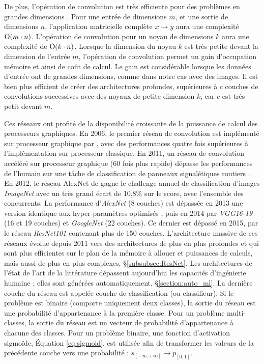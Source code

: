 De plus, l'opération de convolution est très efficiente pour des problèmes en grandes dimensions \cite{goodfellow_deep_2016}.
Pour une entrée de dimensions $m$, et une sortie de dimensions $n$, l'application matricielle complète $x \rightarrow y$ aura une complexité $\operatorname{O}(m \cdot n)$.
L'opération de convolution pour un noyau de dimensions $k$ aura une complexité de $\operatorname{O}(k \cdot n)$.
Lorsque la dimension du noyau $k$ est très petite devant la dimension de l'entrée $m$, l'opération de convolution permet un gain d'occupation mémoire et ainsi de coût de calcul.
Le gain est considérable lorsque les données d'entrée ont de grandes dimensions, comme dans notre cas avec des images.
Il est bien plus efficient de créer des architectures profondes, supérieures à $c$ couches de convolutions successives avec des noyaux de petite dimension $k$, car $c$ est très petit devant $m$.

Ces réseaux ont profité de la disponibilité croissante de la puissance de calcul des processeurs graphiques.
En 2006, le premier réseau de convolution est implémenté sur processeur graphique par \citeauthor{chellapilla_high_2006} \cite{chellapilla_high_2006}, avec des performances quatre fois supérieures à l'implémentation sur processeur classique.
En 2011, un réseau de convolution accéléré sur processeur graphique (60 fois plus rapide) dépasse les performances de l'humain sur une tâche de classification de panneaux signalétiques routiers \cite{ciresan_flexible_2011}.
En 2012, le réseau AlexNet de \citeauthor{krizhevsky_imagenet_2012} \cite{krizhevsky_imagenet_2012} gagne le challenge annuel de classification d'images \textit{ImageNet} \cite{deng_imagenet_2009} avec un très grand écart de 10,8\% sur le score, avec l'ensemble des concurrents.
La performance d'\textit{AlexNet} (8 couches) est dépassée en 2013 une version identique aux hyper-paramètres optimisés \cite{zeiler_visualizing_2013}, puis en 2014 par \textit{VGG16-19} (16 et 19 couches) \cite{simonyan_very_2014}  et \textit{GoogleNet} (22 couches).
Ce dernier est dépassé en 2015, par le réseau \textit{ResNet101} \cite{he_deep_2015} contenant plus de 150 couches.
L'architecture massive de ces réseaux évolue depuis 2011 vers des architectures de plus en plus profondes \cite{he_deep_2015} et qui sont plus efficientes sur le plan de la mémoire à allouer et puissances de calculs, mais aussi de plus en plus complexes, §\ref{subsubsec:ResNet}.
Les architectures de l'état de l'art de la littérature dépassent aujourd'hui les capacités d'ingénierie humaine ; elles sont générées automatiquement, §\ref{section:auto_ml}.
La dernière couche du réseau est appelée couche de classification (ou classifieur).
Si le problème est binaire (comporte uniquement deux classes), la sortie du réseau est une probabilité d'appartenance à la première classe.
Pour un problème multi-classes, la sortie du réseau est un vecteur de probabilité d'appartenance à chacune des classes.
Pour un problème binaire, une fonction d'activation sigmoïde, Équation \ref{eq:sigmoid}, est utilisée afin de transformer les valeurs de la précédente couche vers une probabilité : $s_{[-\infty; +\infty]} \to p_{[0 ; 1]}$.

